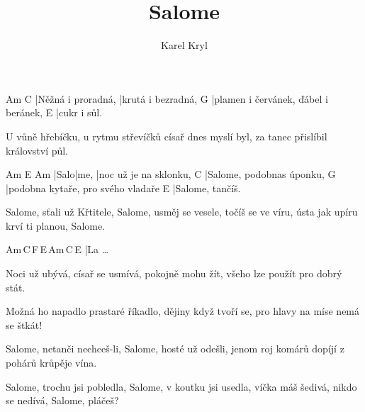 \documentclass{song}
\title{Salome}
\author{Karel Kryl}
\begin{document}
\strophe
Am                 C
|Něžná i proradná, |krutá i bezradná,
G
|plamen i červánek, ďábel i beránek,
E
|cukr i sůl.
\endstrophe

\strophe*
U vůně hřebíčku, u rytmu střevíčků
císař dnes myslí byl, za tanec přislíbil
království půl.
\endstrophe

\strophe
Am   E    Am
|Salo|me, |noc už je na sklonku,
C
|Salome, podobnas úponku,
G
|podobna kytaře, pro svého vladaře
E
|Salome, tančíš.
\endstrophe

\strophe*
Salome, sťali už Křtitele,
Salome, usměj se vesele,
točíš se ve víru, ústa jak upíru
krví ti planou, Salome.
\endstrophe

\strophe
Am\,C\,F\,E\,Am\,C\,E
|La \ldots
\endstrophe

\strophe*
Noci už ubývá, císař se usmívá,
pokojně mohu žít, všeho lze použít
pro dobrý stát.
\endstrophe

\strophe*
Možná ho napadlo prastaré říkadlo,
dějiny když tvoří se, pro hlavy na míse
nemá se štkát!
\endstrophe

\strophe*
Salome, netanči nechceš-li,
Salome, hosté už odešli,
jenom roj komárů dopíjí z pohárů
krůpěje vína.
\endstrophe

\strophe*
Salome, trochu jsi pobledla,
Salome, v koutku jsi usedla,
víčka máš šedivá, nikdo se nedívá,
Salome, pláčeš?
\endstrophe
\end{document}
